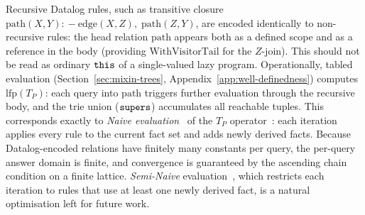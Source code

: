 Recursive Datalog rules, such as transitive closure
$\mathrm{path}(X, Y) \mathrel{{:}\!{-}} \mathrm{edge}(X, Z),\; \mathrm{path}(Z, Y)$,
are encoded identically to non-recursive rules: the
head relation $\mathrm{path}$ appears both as a defined scope
and as a reference in the body (providing
$\mathrm{WithVisitorTail}$ for the $Z$-join).
This should not be read as ordinary $\mathtt{this}$ of a
single-valued lazy program.
Operationally, tabled evaluation
(Section~\ref{sec:mixin-trees},
Appendix~\ref{app:well-definedness})
computes $\mathrm{lfp}(T_P)$: each query into
$\mathrm{path}$ triggers further evaluation through
the recursive body, and the trie union ($\mathtt{supers}$)
accumulates all reachable tuples.
This corresponds exactly to \emph{Naive
evaluation}~\cite{bancilhon1986-recursive-query-strategies} of the
$T_P$
operator~\cite{vanemden1976-predicate-logic-semantics}:
each iteration applies every rule to the current
fact set and adds newly derived facts.
Because Datalog-encoded relations have finitely many
constants per query, the per-query answer domain is
finite, and convergence is guaranteed by the ascending
chain condition on a finite lattice.
\emph{Semi-Naive} evaluation~\cite{bancilhon1986-recursive-query-strategies},
which restricts each iteration to rules that use at
least one newly derived fact, is a natural
optimisation left for future work.

